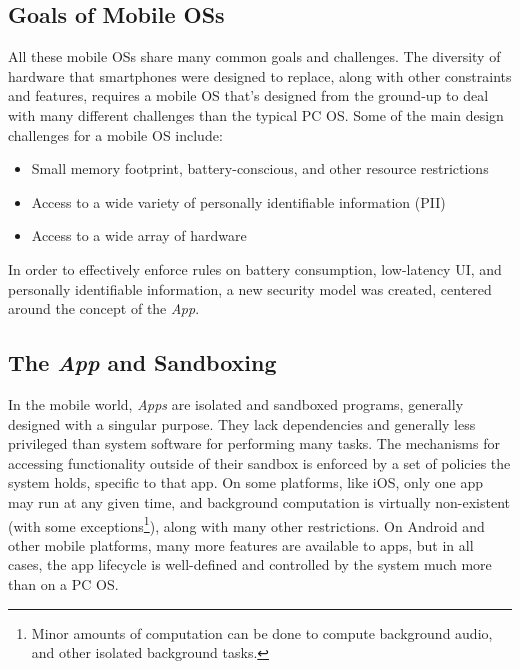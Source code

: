 \documentclass{acm_proc_article-sp}
\begin{document}
\subsection{Goals of Mobile OSs}
All these mobile OSs share many common goals and challenges. The diversity of hardware that smartphones were designed to replace, along with other constraints and features, requires a mobile OS that's designed from the ground-up to deal with many different challenges than the typical PC OS. Some of the main design challenges for a mobile OS include: 
\begin{itemize}

\item Small memory footprint, battery-conscious, and other resource restrictions

\item Access to a wide variety of personally identifiable information (PII)

\item Access to a wide array of hardware

\end{itemize}
In order to effectively enforce rules on battery consumption, low-latency UI, and personally identifiable information, a new security model was created, centered around the concept of the \textit{App}. 



\subsection{The \textit{App} and Sandboxing}

In the mobile world, \textit{Apps} are isolated and sandboxed programs, generally designed with a singular purpose. They lack dependencies and generally less privileged than system software for performing many tasks. The mechanisms for accessing functionality outside of their sandbox is enforced by a set of policies the system holds, specific to that app. On some platforms, like iOS, only one app may run at any given time, and background computation is virtually non-existent (with some exceptions\footnote{Minor amounts of computation can be done to compute background audio, and other isolated background tasks.}), along with many other restrictions. On Android and other mobile platforms, many more features are available to apps, but in all cases, the app lifecycle is well-defined and controlled by the system much more than on a PC OS.
\end{document}
